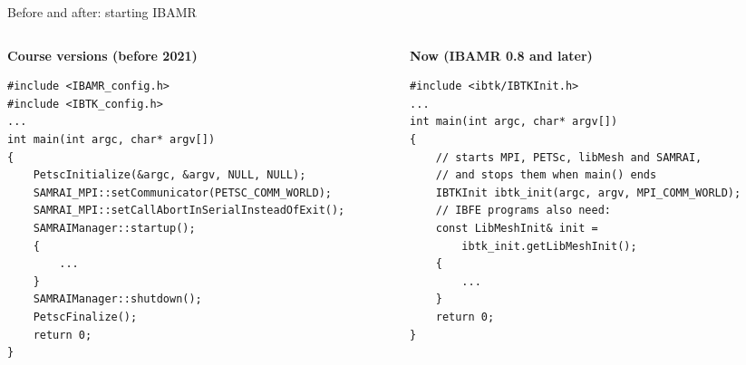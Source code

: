 \documentclass[aspectratio=169,11pt]{beamer}
\begin{document}
\begin{frame}[fragile]{Before and after: starting IBAMR}
\begin{columns}[T,onlytextwidth]
\begin{column}{0.49\textwidth}
\textbf{Course versions (before 2021)}
\begin{lstlisting}[style=cpp,basicstyle=\ttfamily\tiny\color{BlackGray}]
#include <IBAMR_config.h>
#include <IBTK_config.h>
...
int main(int argc, char* argv[])
{
    PetscInitialize(&argc, &argv, NULL, NULL);
    SAMRAI_MPI::setCommunicator(PETSC_COMM_WORLD);
    SAMRAI_MPI::setCallAbortInSerialInsteadOfExit();
    SAMRAIManager::startup();
    {
        ...
    }
    SAMRAIManager::shutdown();
    PetscFinalize();
    return 0;
}
\end{lstlisting}
\end{column}
\begin{column}{0.49\textwidth}
\textbf{Now (IBAMR 0.8 and later)}
\begin{lstlisting}[style=cpp,basicstyle=\ttfamily\tiny\color{BlackGray}]
#include <ibtk/IBTKInit.h>
...
int main(int argc, char* argv[])
{
    // starts MPI, PETSc, libMesh and SAMRAI,
    // and stops them when main() ends
    IBTKInit ibtk_init(argc, argv, MPI_COMM_WORLD);
    // IBFE programs also need:
    const LibMeshInit& init =
        ibtk_init.getLibMeshInit();
    {
        ...
    }
    return 0;
}
\end{lstlisting}
\end{column}
\end{columns}
\end{frame}
\end{document}

